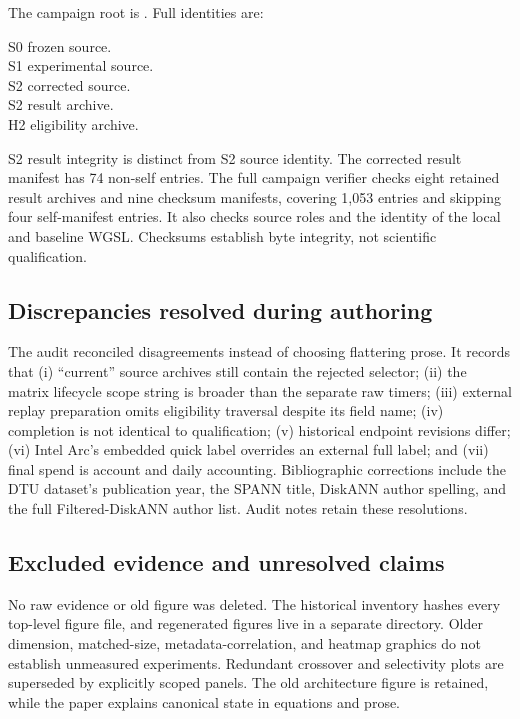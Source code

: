 The campaign root is . Full identities are:
\begin{description}
\item[S0 frozen source.] 
\item[S1 experimental source.] 
\item[S2 corrected source.] 
\item[S2 result archive.] 
\item[H2 eligibility archive.] 
\end{description}
S2 result integrity is distinct from S2 source identity. The corrected result manifest has 74 non-self entries. The full campaign verifier checks eight retained result archives and nine checksum manifests, covering 1,053 entries and skipping four self-manifest entries. It also checks source roles and the identity of the local and baseline WGSL. Checksums establish byte integrity, not scientific qualification.

\subsection{Discrepancies resolved during authoring}
The audit reconciled disagreements instead of choosing flattering prose. It records that (i) ``current'' source archives still contain the rejected selector; (ii) the matrix lifecycle scope string is broader than the separate raw timers; (iii) external replay preparation omits eligibility traversal despite its field name; (iv) completion is not identical to qualification; (v) historical endpoint revisions differ; (vi) Intel Arc's embedded quick label overrides an external full label; and (vii) final spend is account and daily accounting. Bibliographic corrections include the DTU dataset's publication year, the SPANN title, DiskANN author spelling, and the full Filtered-DiskANN author list. Audit notes retain these resolutions.

\subsection{Excluded evidence and unresolved claims}
No raw evidence or old figure was deleted. The historical inventory hashes every top-level figure file, and regenerated figures live in a separate  directory. Older dimension, matched-size, metadata-correlation, and heatmap graphics do not establish unmeasured experiments. Redundant crossover and selectivity plots are superseded by explicitly scoped panels. The old architecture figure is retained, while the paper explains canonical state in equations and prose.

